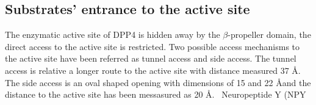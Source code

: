 \subsection{Substrates' entrance to the active site}

The enzymatic active site of DPP4 is hidden away by the $\beta$-propeller domain, the direct access to the active site is restricted. Two possible access mechanisms to the active site have been referred as tunnel access and side access. The tunnel access is relative a longer route to the active site with distance measured 37 \AA. The side access is an oval shaped opening with dimensions of 15 and 22 \AA and the distance to the active site has been messasured as 20 \AA.~\cite{Engel_2003, Rasmussen_2002,Weihofen_2004} Neuropeptide Y (NPY\cite{Aertgeerts_2004}